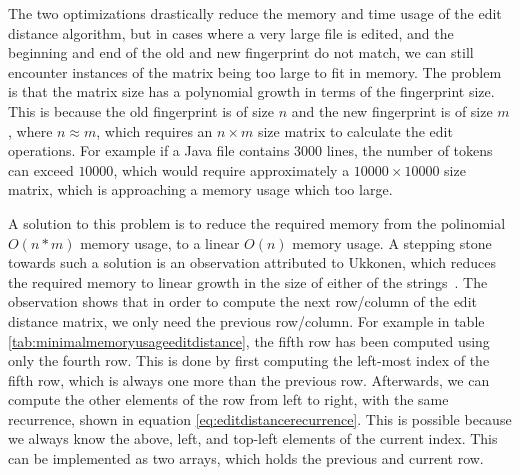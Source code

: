 The two optimizations drastically reduce the memory and time usage of the edit distance
algorithm, but in cases where a very large file is edited, and the beginning and end of
the old and new fingerprint do not match, we can still encounter instances of the matrix
being too large to fit in memory. The problem is that the matrix size has a polynomial
growth in terms of the fingerprint size. This is because the old fingerprint is of size
$n$ and the new fingerprint is of size $m$, where $n \approx m$, which requires an $n
\times m$ size matrix to calculate the edit operations. For example if a Java file
contains $3000$ lines, the number of tokens can exceed $10000$, which would require
approximately a $10000 \times 10000$ size matrix, which is approaching a memory usage
which too large.

A solution to this problem is to reduce the required memory from the polinomial $O(n*m)$
memory usage, to a linear $O(n)$ memory usage. A stepping stone towards such a solution is
an observation attributed to Ukkonen, which reduces the required memory to linear growth
in the size of either of the strings~\cite{UkkonenEditDistance}. The observation shows
that in order to compute the next row/column of the edit distance matrix, we only need the
previous row/column. For example in table \ref{tab:minimalmemoryusageeditdistance}, the
fifth row has been computed using only the fourth row. This is done by first computing the
left-most index of the fifth row, which is always one more than the previous row.
Afterwards, we can compute the other elements of the row from left to right, with the same
recurrence, shown in equation \ref{eq:editdistancerecurrence}. This is possible because we
always know the above, left, and top-left elements of the current index. This can be
implemented as two arrays, which holds the previous and current row. 

